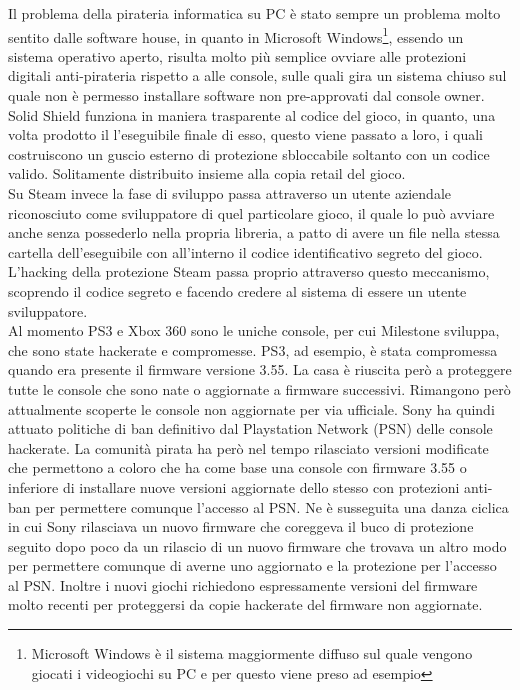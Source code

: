 Il problema della pirateria informatica su PC è stato sempre un problema molto sentito dalle software house, in quanto in Microsoft Windows\footnote{Microsoft Windows è il sistema maggiormente diffuso sul quale vengono giocati i videogiochi su PC e per questo viene preso ad esempio}, essendo un sistema operativo aperto, risulta molto più semplice ovviare alle protezioni digitali anti-pirateria rispetto a alle console, sulle quali gira un sistema chiuso sul quale non è permesso installare software non pre-approvati dal console owner.\\

Solid Shield funziona in maniera trasparente al codice del gioco, in quanto, una volta prodotto il l'eseguibile finale di esso, questo viene passato a loro, i quali costruiscono un guscio esterno di protezione sbloccabile soltanto con un codice valido. Solitamente distribuito insieme alla copia retail del gioco.\\

Su Steam invece la fase di sviluppo passa attraverso un utente aziendale riconosciuto come sviluppatore di quel particolare gioco, il quale lo può avviare anche senza possederlo nella propria libreria, a patto di avere un file nella stessa cartella dell'eseguibile con all'interno il codice identificativo segreto del gioco. L'hacking della protezione Steam passa proprio attraverso questo meccanismo, scoprendo il codice segreto e facendo credere al sistema di essere un utente sviluppatore.\\

Al momento PS3 e Xbox 360 sono le uniche console, per cui Milestone sviluppa, che sono state \gls{hackerate} e compromesse.
PS3, ad esempio, è stata compromessa quando era presente il firmware versione 3.55. La casa è riuscita però a proteggere tutte le console che sono nate o aggiornate a firmware successivi. Rimangono però attualmente scoperte le console non aggiornate per via ufficiale. Sony ha quindi attuato politiche di \gls{ban} definitivo dal Playstation Network (\gls{PSN}) delle console hackerate. La comunità pirata ha però nel tempo rilasciato versioni modificate che permettono a coloro che ha come base una console con firmware 3.55 o inferiore di installare nuove versioni aggiornate dello stesso con protezioni anti-ban per permettere comunque l'accesso al PSN. Ne è susseguita una danza ciclica in cui Sony rilasciava un nuovo firmware che coreggeva il buco di protezione seguito dopo poco da un rilascio di un nuovo firmware che trovava un altro modo per permettere comunque di averne uno aggiornato e la protezione per l'accesso al PSN. Inoltre i nuovi giochi richiedono espressamente versioni del firmware molto recenti per proteggersi da copie hackerate del firmware non aggiornate.\\

